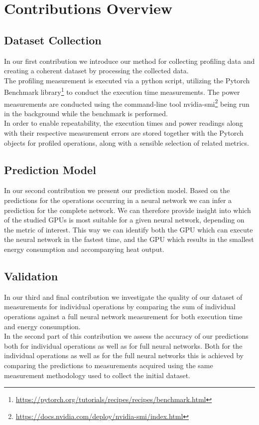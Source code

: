 \section{Contributions Overview}
\subsection{Dataset Collection}
In our first contribution we introduce our method for collecting 
profiling data and creating a coherent dataset by processing the 
collected data.\\
The profiling measurement is executed via a python script, utilizing
the Pytorch Benchmark 
library\footnote{\url{https://pytorch.org/tutorials/recipes/recipes/benchmark.html}}
to conduct the execution time measurements. The power measurements
are conducted using the command-line tool 
nvidia-smi\footnote{\url{https://docs.nvidia.com/deploy/nvidia-smi/index.html}}
being run in the background while the benchmark is performed.\\
In order to enable repeatability, the execution times and power readings
along with their respective measurement errors are stored together with the
Pytorch objects for profiled operations, along with a sensible selection of
related metrics.

\subsection{Prediction Model}
In our second contribution we present our prediction model. Based on the predictions
for the operations occurring in a neural network we can infer a prediction for the 
complete network. We can therefore provide insight into which of the studied GPUs
is most suitable for a given neural network, depending on the metric of interest.
This way we can identify both the GPU which can execute the neural network in the
fastest time, and the GPU which results in the smallest energy consumption and
accompanying heat output.

\subsection{Validation}
In our third and final contribution we investigate the quality of our dataset of
measurements for individual operations by comparing the sum of individual operations
against a full neural network measurement for both execution time and energy consumption.\\
In the second part of this contribution we assess the accuracy of our predictions
both for individual operations as well as for full neural networks. Both for the
individual operations as well as for the full neural networks this is achieved by
comparing the predictions to measurements acquired using the same measurement
methodology used to collect the initial dataset.






% 

% 

